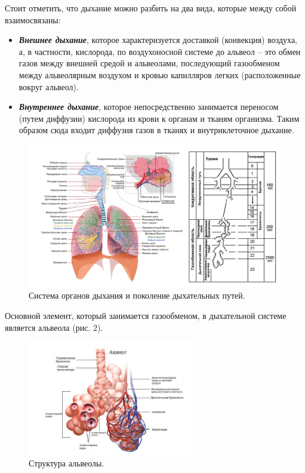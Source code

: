 \documentclass{article}
\begin{document}
            Стоит отметить, что дыхание можно разбить на два вида, которые между
            собой взаимосвязаны:

            \begin{itemize}
                \item \textbf{\textit{Внешнее дыхание}}, которое характеризуется доставкой (конвекция)
                воздуха, а, в частности, кислорода, по воздухоносной системе до
                альвеол – это обмен газов между внешней средой и альвеолами,
                последующий газообменом между альвеолярным воздухом и кровью
                капилляров легких (расположенные вокруг альвеол).

                \item \textbf{\textit{Внутреннее дыхание}}, которое непосредственно занимается
                переносом (путем диффузии) кислорода из крови к органам и тканям
                организма. Таким образом сюда входит диффузия газов в тканях и
                внутриклеточное дыхание.
            \end{itemize}
            \newpage
            \begin{figure}[t]
                \centering
                \includegraphics[width=\textwidth]{Система_органов.png}
                \caption{Система органов дыхания и поколение дыхательных путей.}
            \end{figure}

            Основной элемент, который занимается газообменом, в дыхательной
            системе является альвеола (рис. 2).

            \begin{figure}[h]
                \centering
                \includegraphics[width=0.65\textwidth]{Альвеолы.png}    
                \caption{Структура альвеолы.}
            \end{figure}
\end{document}
